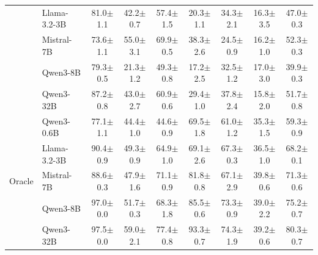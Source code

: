 \begin{table}[t]
\begin{tabular}{@{}ll cccccc c@{}}
  & Llama-3.2-3B   & 81.0{\scriptsize$\pm$1.1} & 42.2{\scriptsize$\pm$0.7} & 57.4{\scriptsize$\pm$1.5} & 20.3{\scriptsize$\pm$1.1} & 34.3{\scriptsize$\pm$2.1} & 16.3{\scriptsize$\pm$3.5} & 47.0{\scriptsize$\pm$0.3} \\

  & Mistral-7B     & 73.6{\scriptsize$\pm$1.1} & 55.0{\scriptsize$\pm$3.1} & 69.9{\scriptsize$\pm$0.5} & 38.3{\scriptsize$\pm$2.6} & 24.5{\scriptsize$\pm$0.9} & 16.2{\scriptsize$\pm$1.0} & 52.3{\scriptsize$\pm$0.3} \\

  & Qwen3-8B       & 79.3{\scriptsize$\pm$0.5} & 21.3{\scriptsize$\pm$1.2} & 49.3{\scriptsize$\pm$0.8} & 17.2{\scriptsize$\pm$2.5} & 32.5{\scriptsize$\pm$1.2} & 17.0{\scriptsize$\pm$3.0} & 39.9{\scriptsize$\pm$0.3} \\

  & Qwen3-32B      & 87.2{\scriptsize$\pm$0.8} & 43.0{\scriptsize$\pm$2.7} & 60.9{\scriptsize$\pm$0.6} & 29.4{\scriptsize$\pm$1.0} & 37.8{\scriptsize$\pm$2.4} & 15.8{\scriptsize$\pm$2.0} & 51.7{\scriptsize$\pm$0.8} \\
\midrule
\multirow{5}{*}{Oracle}
  & Qwen3-0.6B     & 77.1{\scriptsize$\pm$1.1} & 44.4{\scriptsize$\pm$1.0} & 44.6{\scriptsize$\pm$0.9} & 69.5{\scriptsize$\pm$1.8} & 61.0{\scriptsize$\pm$1.2} & 35.3{\scriptsize$\pm$1.5} & 59.3{\scriptsize$\pm$0.9} \\

  & Llama-3.2-3B   & 90.4{\scriptsize$\pm$0.9} & 49.3{\scriptsize$\pm$0.9} & 64.9{\scriptsize$\pm$1.0} & 69.1{\scriptsize$\pm$2.6} & 67.3{\scriptsize$\pm$0.3} & 36.5{\scriptsize$\pm$1.0} & 68.2{\scriptsize$\pm$0.1} \\

  & Mistral-7B     & 88.6{\scriptsize$\pm$0.3} & 47.9{\scriptsize$\pm$1.6} & 71.1{\scriptsize$\pm$0.9} & 81.8{\scriptsize$\pm$0.8} & 67.1{\scriptsize$\pm$2.9} & 39.8{\scriptsize$\pm$0.6} & 71.3{\scriptsize$\pm$0.6} \\

  & Qwen3-8B       & 97.0{\scriptsize$\pm$0.0} & 51.7{\scriptsize$\pm$0.3} & 68.3{\scriptsize$\pm$1.8} & 85.5{\scriptsize$\pm$0.6} & 73.3{\scriptsize$\pm$0.9} & 39.0{\scriptsize$\pm$2.2} & 75.2{\scriptsize$\pm$0.7} \\

  & Qwen3-32B      & 97.5{\scriptsize$\pm$0.0} & 59.0{\scriptsize$\pm$2.1} & 77.4{\scriptsize$\pm$0.8} & 93.3{\scriptsize$\pm$0.7} & 74.3{\scriptsize$\pm$1.9} & 39.2{\scriptsize$\pm$0.6} & 80.3{\scriptsize$\pm$0.7} \\
\bottomrule
\end{tabular}
\end{table}
